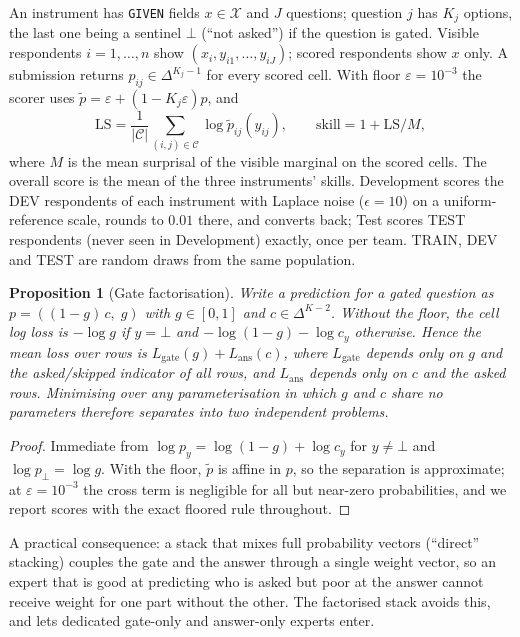 \documentclass[10pt]{article}
\newtheorem{proposition}{Proposition}
\begin{document}
An instrument has \texttt{GIVEN} fields $x\in\mathcal{X}$ and $J$ questions; question $j$ has $K_j$ options, the last one being a sentinel $\bot$ (``not asked'') if the question is gated. Visible respondents $i=1,\dots,n$ show $(x_i,y_{i1},\dots,y_{iJ})$; scored respondents show $x$ only. A submission returns $p_{ij}\in\Delta^{K_j-1}$ for every scored cell. With floor $\varepsilon=10^{-3}$ the scorer uses $\tilde p = \varepsilon + (1-K_j\varepsilon)p$, and
\begin{equation}
\mathrm{LS} = \frac{1}{|\mathcal{C}|}\sum_{(i,j)\in\mathcal{C}} \log \tilde p_{ij}(y_{ij}),\qquad
\mathrm{skill} = 1 + \mathrm{LS}/M,
\end{equation}
where $M$ is the mean surprisal of the visible marginal on the scored cells. The overall score is the mean of the three instruments' skills. Development scores the DEV respondents of each instrument with Laplace noise ($\epsilon=10$) on a uniform-reference scale, rounds to $0.01$ there, and converts back; Test scores TEST respondents (never seen in Development) exactly, once per team. TRAIN, DEV and TEST are random draws from the same population.

\begin{proposition}[Gate factorisation]
\label{prop:fact}
Write a prediction for a gated question as $p=((1-g)\,c,\;g)$ with $g\in[0,1]$ and $c\in\Delta^{K-2}$. Without the floor, the cell log loss is $-\log g$ if $y=\bot$ and $-\log(1-g)-\log c_y$ otherwise. Hence the mean loss over rows is $L_{\mathrm{gate}}(g)+L_{\mathrm{ans}}(c)$, where $L_{\mathrm{gate}}$ depends only on $g$ and the asked/skipped indicator of all rows, and $L_{\mathrm{ans}}$ depends only on $c$ and the asked rows. Minimising over any parameterisation in which $g$ and $c$ share no parameters therefore separates into two independent problems.
\end{proposition}
\begin{proof}
Immediate from $\log p_y = \log(1-g)+\log c_y$ for $y\ne\bot$ and $\log p_\bot=\log g$. With the floor, $\tilde p$ is affine in $p$, so the separation is approximate; at $\varepsilon=10^{-3}$ the cross term is negligible for all but near-zero probabilities, and we report scores with the exact floored rule throughout.
\end{proof}

A practical consequence: a stack that mixes full probability vectors (``direct'' stacking) couples the gate and the answer through a single weight vector, so an expert that is good at predicting who is asked but poor at the answer cannot receive weight for one part without the other. The factorised stack avoids this, and lets dedicated gate-only and answer-only experts enter.
\end{document}
